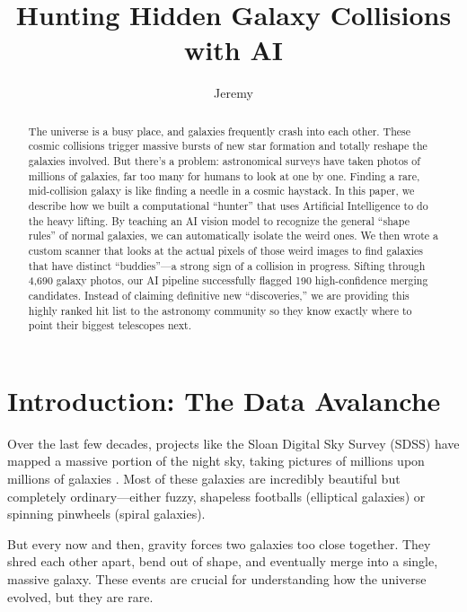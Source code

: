\documentclass[twocolumn]{aastex631}
\begin{document}
\title{Hunting Hidden Galaxy Collisions with AI}

\author{Jeremy}

\begin{abstract}
The universe is a busy place, and galaxies frequently crash into each other. These cosmic collisions trigger massive bursts of new star formation and totally reshape the galaxies involved. But there's a problem: astronomical surveys have taken photos of millions of galaxies, far too many for humans to look at one by one. Finding a rare, mid-collision galaxy is like finding a needle in a cosmic haystack. In this paper, we describe how we built a computational ``hunter'' that uses Artificial Intelligence to do the heavy lifting. By teaching an AI vision model to recognize the general ``shape rules'' of normal galaxies, we can automatically isolate the weird ones. We then wrote a custom scanner that looks at the actual pixels of those weird images to find galaxies that have distinct ``buddies''—a strong sign of a collision in progress. Sifting through 4,690 galaxy photos, our AI pipeline successfully flagged 190 high-confidence merging candidates. Instead of claiming definitive new ``discoveries,'' we are providing this highly ranked hit list to the astronomy community so they know exactly where to point their biggest telescopes next.
\end{abstract}


\section{Introduction: The Data Avalanche} \label{sec:intro}

Over the last few decades, projects like the Sloan Digital Sky Survey (SDSS) have mapped a massive portion of the night sky, taking pictures of millions upon millions of galaxies \citep{york2000}. Most of these galaxies are incredibly beautiful but completely ordinary—either fuzzy, shapeless footballs (elliptical galaxies) or spinning pinwheels (spiral galaxies). 

But every now and then, gravity forces two galaxies too close together. They shred each other apart, bend out of shape, and eventually merge into a single, massive galaxy. These events are crucial for understanding how the universe evolved, but they are rare. 
\end{document}
